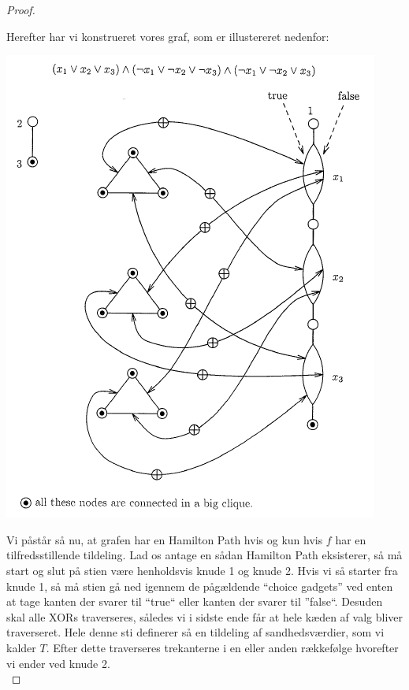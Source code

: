 \begin{proof}
\begin{enumerate}
\end{enumerate}
Herefter har vi konstrueret vores graf, som er illustereret nedenfor:

\begin{center}
 \includegraphics[bb=0 0 350 440]{img/hamiltonPath.png}
\end{center}

Vi påstår så nu, at grafen har en Hamilton Path hvis og kun hvis $f$ har en
tilfredsstillende tildeling. Lad os antage en sådan Hamilton Path eksisterer,
så må start og slut på stien være henholdsvis knude 1 og knude 2. Hvis vi så
starter fra knude 1, så må stien gå ned igennem de pågældende ``choice
gadgets'' ved enten at tage kanten der svarer til ``true`` eller kanten der
svarer til ''false``. Desuden skal alle XORs traverseres, således vi i sidste
ende får at hele kæden af valg bliver traverseret. Hele denne sti definerer så
en tildeling af sandhedsværdier, som vi kalder $T$. Efter dette traverseres
trekanterne i en eller anden rækkefølge hvorefter vi ender ved knude 2.\\


\end{proof}
